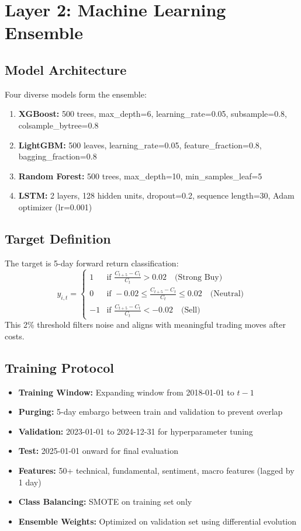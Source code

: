 \documentclass[12pt,a4paper]{report}
\begin{document}
\section{Layer 2: Machine Learning Ensemble}
\subsection{Model Architecture}
Four diverse models form the ensemble:
\begin{enumerate}
    \item \textbf{XGBoost:} 500 trees, max\_depth=6, learning\_rate=0.05, subsample=0.8, colsample\_bytree=0.8
    \item \textbf{LightGBM:} 500 leaves, learning\_rate=0.05, feature\_fraction=0.8, bagging\_fraction=0.8
    \item \textbf{Random Forest:} 500 trees, max\_depth=10, min\_samples\_leaf=5
    \item \textbf{LSTM:} 2 layers, 128 hidden units, dropout=0.2, sequence length=30, Adam optimizer (lr=0.001)
\end{enumerate}

\subsection{Target Definition}
The target is 5-day forward return classification:
\begin{equation}
    y_{i,t} = 
    \begin{cases}
        1 & \text{if } \frac{C_{t+5} - C_t}{C_t} > 0.02 \quad \text{(Strong Buy)} \\
        0 & \text{if } -0.02 \le \frac{C_{t+5} - C_t}{C_t} \le 0.02 \quad \text{(Neutral)} \\
        -1 & \text{if } \frac{C_{t+5} - C_t}{C_t} < -0.02 \quad \text{(Sell)}
    \end{cases}
\end{equation}
This 2\% threshold filters noise and aligns with meaningful trading moves after costs.

\subsection{Training Protocol}
\begin{itemize}
    \item \textbf{Training Window:} Expanding window from 2018-01-01 to $t-1$
    \item \textbf{Purging:} 5-day embargo between train and validation to prevent overlap
    \item \textbf{Validation:} 2023-01-01 to 2024-12-31 for hyperparameter tuning
    \item \textbf{Test:} 2025-01-01 onward for final evaluation
    \item \textbf{Features:} 50+ technical, fundamental, sentiment, macro features (lagged by 1 day)
    \item \textbf{Class Balancing:} SMOTE on training set only
    \item \textbf{Ensemble Weights:} Optimized on validation set using differential evolution
\end{itemize}
\end{document}
